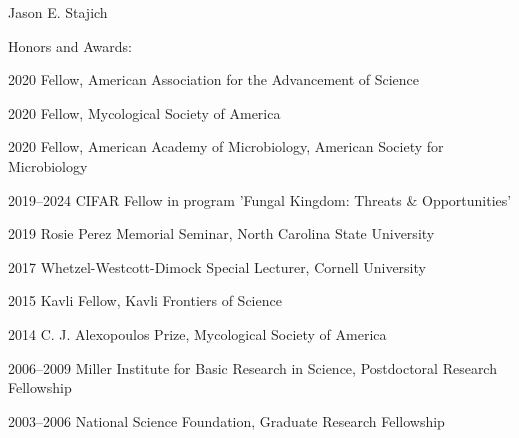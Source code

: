\documentclass[10pt]{article}
\def\endthebibliography{\end{etaremune}}
\newlength{\oldcvlabelwidth}
\begin{document}
\begin{cv}{\centerline{Jason E. Stajich}}
\begin{cvlistcompact}{Honors and Awards:}
\item [2020] Fellow, American Association for the Advancement of Science
\item [2020] Fellow, Mycological Society of America
\item [2020] Fellow, American Academy of Microbiology, American
  Society for Microbiology
\item [2019--2024] CIFAR Fellow in program 'Fungal Kingdom: Threats \& Opportunities'
\item [2019] Rosie Perez Memorial Seminar, North Carolina State University
\item [2017] Whetzel-Westcott-Dimock Special Lecturer, Cornell University
\item [2015] Kavli Fellow, Kavli Frontiers of Science
\item [2014] C. J. Alexopoulos Prize, Mycological Society of America
\item [2006--2009] Miller Institute for Basic Research in Science,
  Postdoctoral Research Fellowship
\item [2003--2006] National Science Foundation, Graduate Research Fellowship
\end{cvlistcompact}

\setlength{\oldcvlabelwidth}{\cvlabelwidth}
\setlength{\cvlabelwidth}{1em}
\renewcommand*{\bibindent}{1.5em}
\renewcommand*{\biblabelsep}{1.5em}


\makeatletter
\def\thebibliography#1{\list
{\arabic{enumiv}.}{\settowidth\labelwidth{[#1]}\leftmargin\labelwidth
\advance\leftmargin\labelsep
\usecounter{enumiv}}
\def\newblock{\hskip .11em plus .33em minus .07em}
\sloppy\clubpenalty4000\widowpenalty4000
\sfcode`\.=1000\relax
}
\let\endthebibliography=\endlist
\makeatother


\end{cv}
\end{document}

